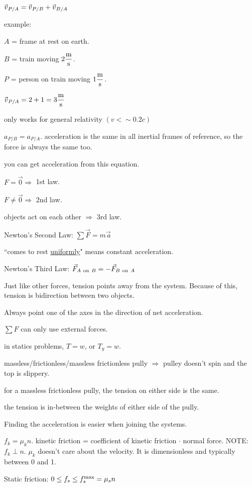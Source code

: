 \documentclass[12pt]{article}
\newcommand \hpx [1]{\hspace{#1px}}
\newcommand \nhpx [1]{\hspace{-#1px}}
\newcommand \avec {\!\vec{\,a}}
\newcommand \Fvec {\vec F}
\newcommand \vvec {\nhpx 1 \vec{\hpx 1 v}}
\begin{document}
$\vvec_{P/A} = \vvec_{P/B} + \vvec_{B/A}$

example:

$A$ = frame at rest on earth.

$B$ = train moving $2 \rm \dfrac m s$.

$P$ = person on train moving $1 \rm \dfrac m s$.

$\vvec_{P/A} = 2 + 1 = 3\rm \dfrac ms$

only works for general relativity $(v < \sim 0.2c)$

$a_{P/B} = a_{P/A}$. acceleration is the same in all inertial frames of reference, so the force is always the same too.

you can get acceleration from this equation.

$F =   \vec 0 \Longrightarrow $ 1st law.

$F \ne \vec 0 \Longrightarrow $ 2nd law.

objects act on each other $\Longrightarrow$ 3rd law.

Newton's Second Law: $\sum\Fvec = m\avec$

``comes to rest \underline{uniformly}" means constant acceleration.

Newton's Third Law: $\Fvec_{A~{\rm on}~B}=-\Fvec_{B~{\rm on}~A}$

Just like other forces, tension points away from the system. Because of this, tension is bidirection between two objects.

Always point one of the axes in the direction of net acceleration.

$\sum F$ can only use external forces.

in statics problems, $T = w$, or $T_y = w$.

massless/frictionless/massless frictionless pully $\Longrightarrow$ pulley doesn't spin and the top is slippery.

for a massless frictionless pully, the tension on either side is the same.

the tension is in-between the weights of either side of the pully.

Finding the acceleration is easier when joining the systems.

$f_k = \mu_kn$. kinetic friction = coefficient of kinetic friction $\cdot$ normal force. NOTE: $f_k \perp n$. $\mu_k$ doesn't care about the velocity. It is dimensionless and typically between 0 and 1.

Static friction: $0 \le f_s \le f_s^{\rm max} = \mu_s n$
\end{document}
